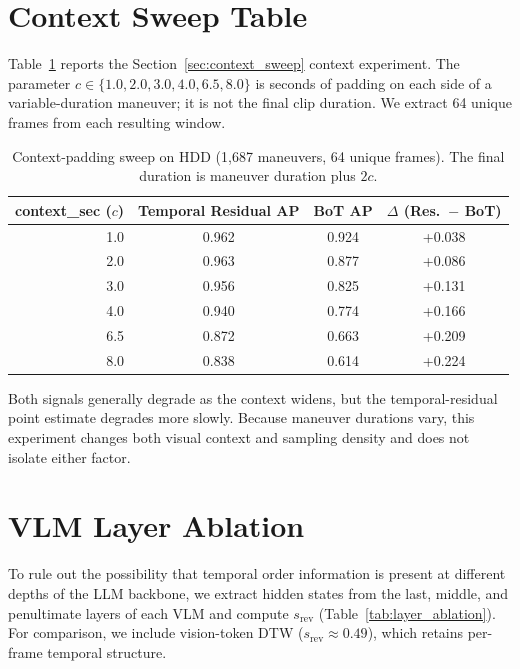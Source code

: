 \documentclass{article}
\theoremstyle{remark}
\begin{document}
\section{Context Sweep Table}
\label{sec:context_sweep_table}

Table~\ref{tab:context_sweep} reports the Section~\ref{sec:context_sweep} context experiment. The parameter $c \in \{1.0, 2.0, 3.0, 4.0, 6.5, 8.0\}$ is seconds of padding on each side of a variable-duration maneuver; it is not the final clip duration. We extract 64 unique frames from each resulting window.

\begin{table}[h]
\centering
\caption{Context-padding sweep on HDD (1{,}687 maneuvers, 64 unique frames). The final duration is maneuver duration plus $2c$.}
\label{tab:context_sweep}
\begin{tabular}{rccc}
\toprule
\textbf{context\_sec ($c$)} & \textbf{Temporal Residual AP} & \textbf{BoT AP} & \textbf{$\Delta$ (Res.\ $-$ BoT)} \\
\midrule
1.0 & 0.962 & 0.924 & +0.038 \\
2.0 & 0.963 & 0.877 & +0.086 \\
3.0 & 0.956 & 0.825 & +0.131 \\
4.0 & 0.940 & 0.774 & +0.166 \\
6.5 & 0.872 & 0.663 & +0.209 \\
8.0 & 0.838 & 0.614 & +0.224 \\
\bottomrule
\end{tabular}
\end{table}

Both signals generally degrade as the context widens, but the temporal-residual point estimate degrades more slowly. Because maneuver durations vary, this experiment changes both visual context and sampling density and does not isolate either factor.

\section{VLM Layer Ablation}
\label{sec:layer_ablation}

To rule out the possibility that temporal order information is present at different depths of the LLM backbone, we extract hidden states from the last, middle, and penultimate layers of each VLM and compute $s_\text{rev}$ (Table~\ref{tab:layer_ablation}). For comparison, we include vision-token DTW ($s_\text{rev} \approx 0.49$), which retains per-frame temporal structure.
\end{document}
